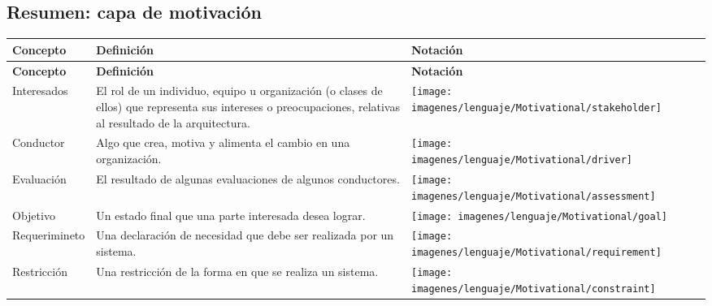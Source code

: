 \subsection{Resumen: capa de motivación}
\begin{center}
\begin{longtable}{| >{\centering\arraybackslash}m{3cm} | >{\arraybackslash}m{6cm} | p{4cm} | p{5cm} | p{4cm} |}
	
		\hline
		\textbf{Concepto} &  \centering \textbf{Definición} & \textbf{Notación} \\
		\hline
		\endfirsthead
		
		
		\hline
		\textbf{Concepto} &  \centering \textbf{Definición} & \textbf{Notación} \\
		\hline
		\endhead
		
		Interesados & 
		\vspace{1mm} El rol de un individuo, equipo u organización (o clases de ellos) que representa sus intereses o preocupaciones, relativas al resultado de la arquitectura.& 
		\texttt{[image: imagenes/lenguaje/Motivational/stakeholder]}\\ 
		\hline
		
		Conductor & 
		\vspace{1mm} 
		 Algo que crea, motiva y alimenta el cambio en una organización. & 
		\texttt{[image: imagenes/lenguaje/Motivational/driver]}\\ 
		\hline
		
		Evaluación &
		\vspace{1mm} El resultado de algunas evaluaciones de algunos conductores. & 
		\texttt{[image: imagenes/lenguaje/Motivational/assessment]}\\ 
		\hline
		
		Objetivo & 
		\vspace{1mm} Un estado final que una parte interesada desea lograr.& 
		\texttt{[image: imagenes/lenguaje/Motivational/goal]}  \\ 
		\hline
		
		Requerimineto &
		\vspace{1mm} Una declaración de necesidad que debe ser realizada por un sistema. & 
		\texttt{[image: imagenes/lenguaje/Motivational/requirement]}  \\ 
		\hline
		
		Restricción & 
		\vspace{1mm} Una restricción de la forma en que se realiza un sistema.& 
		\texttt{[image: imagenes/lenguaje/Motivational/constraint]}  \\ 
		\hline 
		

\end{longtable}
\end{center}
